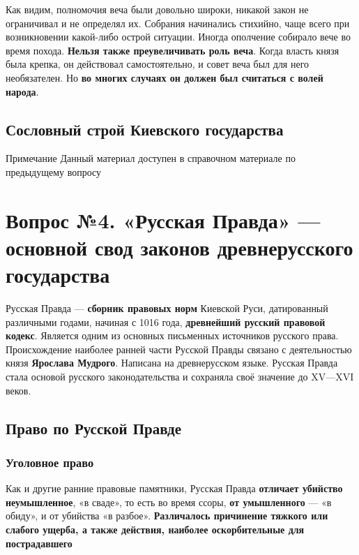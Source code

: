 \documentclass{article}
\begin{document}
\hfill

Как видим, полномочия веча были довольно широки, никакой закон не ограничивал и не определял их. Собрания начинались стихийно, чаще всего при возникновении какой-либо острой ситуации. Иногда ополчение собирало вече во время похода. \textbf{Нельзя также преувеличивать роль веча}. Когда власть князя была крепка, он действовал самостоятельно, и совет веча был для него необязателен. Но \textbf{во многих случаях он должен был считаться с волей народа}.

\subsection{Сословный строй Киевского государства}

\begin{bclogo}[logo=\bcinfo, couleurBarre=orange, noborder=true, couleur=white]{Примечание}
    Данный материал доступен в справочном материале по предыдущему вопросу
\end{bclogo}

\pagebreak
\section{Вопрос №4. «Русская Правда» — основной свод законов древнерусского государства}

Русская Правда — \textbf{сборник правовых норм} Киевской Руси, датированный различными годами, начиная с 1016 года, \textbf{древнейший русский правовой кодекс}. Является одним из основных письменных источников русского права. Происхождение наиболее ранней части Русской Правды связано с деятельностью князя \textbf{Ярослава Мудрого}. Написана на древнерусском языке. Русская Правда стала основой русского законодательства и сохраняла своё значение до XV—XVI веков.

\subsection{Право по Русской Правде}

\subsubsection{Уголовное право}

Как и другие ранние правовые памятники, Русская Правда \textbf{отличает убийство неумышленное}, «в сваде», то есть во время ссоры, \textbf{от умышленного} — «в обиду», и от убийства «в разбое». \textbf{Различалось причинение тяжкого или слабого ущерба, а также действия, наиболее оскорбительные для пострадавшего}
\end{document}
